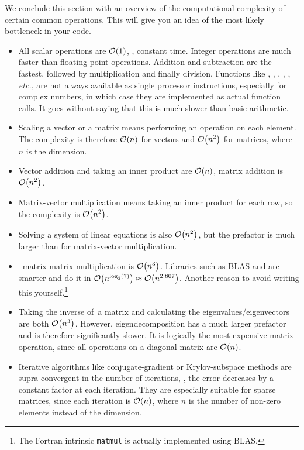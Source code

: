 We conclude this section with an overview of the computational complexity of certain common operations.
This will give you an idea of the most likely bottleneck in your code.
\begin{itemize}
  \item All scalar operations are $\mathcal{O}\!\left(1\right)$, \ie, constant time.
    Integer operations are much faster than floating-point operations.
    Addition and subtraction are the fastest, followed by multiplication and finally division.
    Functions like , , , , , \emph{etc.}, are not always available as single processor instructions, especially for complex numbers, in which case they are implemented as actual function calls.
    It goes without saying that this is much slower than basic arithmetic.
  \item Scaling a vector or a matrix means performing an operation on each element.
    The complexity is therefore $\mathcal{O}\!\left(n\right)$ for vectors and $\mathcal{O}\!\left(n^2\right)$ for matrices, where $n$ is the dimension.
  \item Vector addition and taking an inner product are $\mathcal{O}\!\left(n\right)$, matrix addition is $\mathcal{O}\!\left(n^2\right)$.
  \item Matrix-vector multiplication means taking an inner product for each row, so the complexity is $\mathcal{O}\!\left(n^2\right)$.
  \item Solving a system of linear equations is also $\mathcal{O}\!\left(n^2\right)$, but the prefactor is much larger than for matrix-vector multiplication.
  \item \Naive\ matrix-matrix multiplication is $\mathcal{O}\!\left(n^3\right)$.
    Libraries such as BLAS and  are smarter and do it in $\mathcal{O}\!\left(n^{\log_2(7)}\right)\approx\mathcal{O}\!\left(n^{2.807}\right)$.
    Another reason to avoid writing this yourself.\footnote{The Fortran intrinsic \texttt{matmul} is actually implemented using BLAS.}
  \item Taking the inverse of\ a matrix and calculating the eigenvalues/eigenvectors are both $\mathcal{O}\!\left(n^3\right)$.
    However, eigendecomposition has a much larger prefactor and is therefore significantly slower.
    It is logically the most expensive matrix operation, since all operations on a diagonal matrix are $\mathcal{O}\!\left(n\right)$.
  \item Iterative algorithms like conjugate-gradient or Krylov-subspace methods are supra-convergent in the number of iterations, \ie, the error decreases by a constant factor at each iteration.
    They are especially suitable for sparse matrices, since each iteration is $\mathcal{O}\!\left(n\right)$, where $n$ is the number of non-zero elements instead of the dimension.
\end{itemize}


